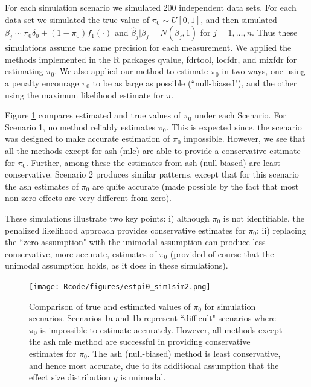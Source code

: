 \documentclass[10pt]{article}
\begin{document}
For each simulation scenario we simulated 200 independent data sets. For each data set we simulated
the true value of $\pi_0  \sim U[0,1]$, and then simulated $\beta_j \sim \pi_0 \delta_0 + (1-\pi_0) f_1(\cdot)$
and $\hat\beta_j | \beta_j = N(\beta_j,1)$ for $j=1,\dots,n$. Thus these simulations assume the same
precision for each measurement. We applied the methods implemented in the R packages qvalue, fdrtool, locfdr, and mixfdr
for estimating $\pi_0$. We also applied our method to estimate $\pi_0$ in two ways, one using a penalty encourage
$\pi_0$ to be as large as possible (``null-biased"), and the other using the maximum likelihood estimate for $\pi$.


Figure \ref{fig:pi0} compares estimated and true values of $\pi_0$ under each Scenario. 
For Scenario 1, no method reliably estimates $\pi_0$. This is expected since, the scenario was designed to make accurate estimation
of $\pi_0$ impossible. However, we see that all the methods except for ash (mle) are able to provide a conservative
estimate for $\pi_0$. Further, among these the estimates from ash (null-biased) are least conservative. Scenario 2 produces similar patterns,
except that for this scenario the ash estimates of $\pi_0$ are quite accurate (made possible by the fact that most non-zero effects
are very different from zero).

These simulations illustrate two key points: i) although $\pi_0$ is not identifiable, the penalized likelihood approach
provides conservative estimates for $\pi_0$; ii) replacing the ``zero assumption" with the unimodal assumption can produce
less conservative, more accurate, estimates of $\pi_0$ (provided of course that the unimodal assumption holds, as it does in these simulations).

\begin{figure}[!ht] \label{fig:pi0}
\begin{center}
\texttt{[image: Rcode/figures/estpi0\_sim1sim2.png]}
\end{center}
\caption{Comparison of true and estimated values of $\pi_0$ for simulation scenarios. Scenarios 1a and 1b represent ``difficult" scenarios where $\pi_0$ is impossible to estimate accurately. However, all methods except the ash mle method are successful in providing conservative estimates for $\pi_0$. The ash (null-biased) method is least conservative, and hence most accurate, due to its additional assumption that the effect size distribution $g$ is unimodal.}
\end{figure}
\end{document}
